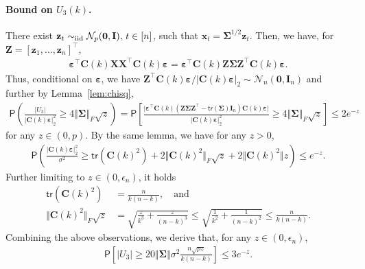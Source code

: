 \documentclass[11pt, a4paper]{article}
\newcommand{\mbf}{\mathbf}
\newcommand{\mc}{\mathcal}
\newcommand{\eps}{\epsilon}
\newcommand{\vep}{\varepsilon}
\renewcommand{\l}{\left}
\renewcommand{\r}{\right}
\newcommand{\tr}[0]{\mathsf{tr}}
\newcommand{\p}{\mathsf{P}}
\newcommand{\iid}{\text{\upshape iid}}
\theoremstyle{definition}
\theoremstyle{definition}
\theoremstyle{definition}
\theoremstyle{definition}
\theoremstyle{definition}
\theoremstyle{remark}
\theoremstyle{definition}
\theoremstyle{definition}
\theoremstyle{definition}
\begin{document}
\paragraph{Bound on $U_3(k)$.}
There exist $\mbf z_t \sim_{\iid} \mc N_p(\mbf 0, \mbf I), \, t \in [n]$, such that $\mbf x_t = \bm\Sigma^{1/2} \mbf z_t$.
Then, we have, for $\mbf Z = [\mbf z_1, \ldots, \mbf z_n]^\top$, 
\begin{align*}
\bm\vep^\top \mbf C(k) \mbf X\mbf X^\top \mbf C(k) \bm\vep = \bm\vep^\top \mbf C(k) \mbf Z \bm\Sigma \mbf Z^\top \mbf C(k) \bm\vep.
\end{align*}
Thus, conditional on $\bm\vep$, we have $\mbf Z^\top \mbf C(k) \bm\vep/\vert\mbf C(k) \bm\vep\vert_2\sim\mc N_n(\mbf 0, \mbf I_n)$ and  further by Lemma~\ref{lem:chisq}, 
\begin{align*}
\p\l( \frac{\vert U_3 \vert}{\vert \mbf C(k) \bm\vep \vert_2^2} \ge 4 \Vert \bm\Sigma \Vert_F \sqrt{z} \r)
= \p\l[ \frac{\vert \bm\vep^\top \mbf C(k) (\mbf Z \bm\Sigma \mbf Z^\top - \tr(\bm\Sigma) \mbf I_n) \mbf C(k) \bm\vep \vert}{\vert \mbf C(k) \bm\vep \vert_2^2} \ge 4 \Vert \bm\Sigma \Vert_F \sqrt{z} \r]
\le 2e^{-z}
\end{align*}
for any $z \in (0, p)$.
By the same lemma, we have for any $z > 0$,
\begin{align*}
\p\l( \frac{\vert \mbf C(k) \bm\vep \vert_2^2}{\sigma^2} \ge \tr(\mbf C(k)^2) + 2 \Vert \mbf C(k)^2 \Vert_F \sqrt{z} + 2 \Vert \mbf C(k)^2 \Vert z \r) \le e^{-z}.
\end{align*}
Further limiting to $z \in (0, \eps_n)$, it holds
\begin{align*}
\tr(\mbf C(k)^2) &= \frac{n}{k(n - k)}, \quad \text{and}
\\
\Vert \mbf C(k)^2 \Vert_F \sqrt{z} &= \sqrt{\frac{z}{k^3} + \frac{z}{(n - k)^3}} \le \sqrt{\frac{1}{k^2} + \frac{1}{(n - k)^2}} \le \frac{n}{k(n - k)}.
\end{align*}
Combining the above observations, we derive that, for any $z \in (0, \eps_n)$,
\begin{align*}
\p\l[ \vert U_3 \vert \ge 20 \Vert \bm\Sigma \Vert \sigma^2 \frac{n \sqrt{pz}}{k(n - k)} \r] \le 3e^{-z}.
\end{align*}
\end{document}
